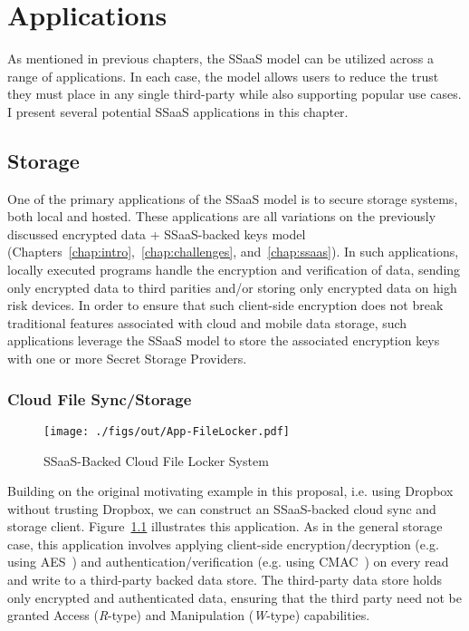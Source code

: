 \chapter{Applications}
\label{chap:apps}

As mentioned in previous chapters, the SSaaS model can be utilized
across a range of applications. In each case, the model allows users
to reduce the trust they must place in any single third-party while
also supporting popular use cases. I present several potential SSaaS
applications in this chapter.

\section{Storage}

One of the primary applications of the SSaaS model is to secure
storage systems, both local and hosted. These applications are all
variations on the previously discussed encrypted data + SSaaS-backed
keys model (Chapters~\ref{chap:intro},~\ref{chap:challenges},
and~\ref{chap:ssaas}). In such applications, locally executed programs
handle the encryption and verification of data, sending only encrypted
data to third parities and/or storing only encrypted data on high risk
devices. In order to ensure that such client-side encryption does not
break traditional features associated with cloud and mobile data
storage, such applications leverage the SSaaS model to store the
associated encryption keys with one or more Secret Storage Providers.

\subsection{Cloud File Sync/Storage}

\begin{figure}[t]
  \centering
  \texttt{[image: ./figs/out/App-FileLocker.pdf]}
  \caption{SSaaS-Backed Cloud File Locker System}
  \label{fig:apps-filestore}
\end{figure}

Building on the original motivating example in this proposal,
i.e. using Dropbox without trusting Dropbox, we can construct an
SSaaS-backed cloud sync and storage
client. Figure~\ref{fig:apps-filestore} illustrates this
application. As in the general storage case, this application involves
applying client-side encryption/decryption (e.g. using
AES~\cite{nist2001}) and authentication/verification (e.g. using
CMAC~\cite{dworkin2005}) on every read and write to a third-party
backed data store. The third-party data store holds only encrypted and
authenticated data, ensuring that the third party need not be granted
Access (\emph{R}-type) and Manipulation (\emph{W}-type) capabilities.

